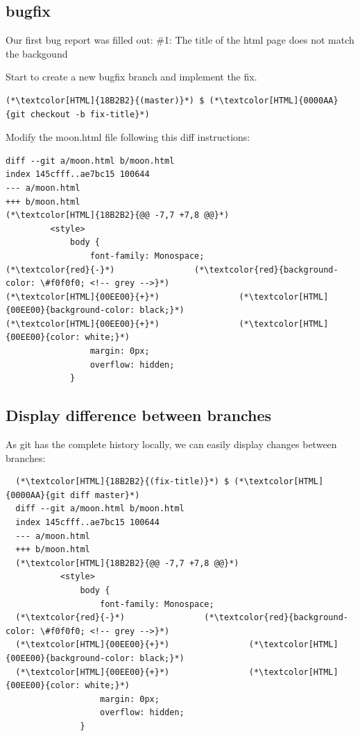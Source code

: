 \subsection{bugfix}
\begin{frame}[fragile]
    \subslidetitle

Our first bug report was filled out:
\newline \vspace{1em}
\#1: The title of the html page does not match the backgound

Start to create a new bugfix branch and implement the fix.
\begin{lstlisting}
(*\textcolor[HTML]{18B2B2}{(master)}*) $ (*\textcolor[HTML]{0000AA}{git checkout -b fix-title}*)
\end{lstlisting}

Modify the moon.html file following this diff instructions:
\begin{lstlisting}
diff --git a/moon.html b/moon.html
index 145cfff..ae7bc15 100644
--- a/moon.html
+++ b/moon.html
(*\textcolor[HTML]{18B2B2}{@@ -7,7 +7,8 @@}*)
         <style>
             body {
                 font-family: Monospace;
(*\textcolor{red}{-}*)                (*\textcolor{red}{background-color: \#f0f0f0; <!-- grey -->}*)
(*\textcolor[HTML]{00EE00}{+}*)                (*\textcolor[HTML]{00EE00}{background-color: black;}*)
(*\textcolor[HTML]{00EE00}{+}*)                (*\textcolor[HTML]{00EE00}{color: white;}*)
                 margin: 0px;
                 overflow: hidden;
             }
\end{lstlisting}
\end{frame}

\subsection{Display difference between branches}
\begin{frame}[fragile]
  \subslidetitle

  As git has the complete history locally, we can easily display changes between branches:

  \begin{lstlisting}
  (*\textcolor[HTML]{18B2B2}{(fix-title)}*) $ (*\textcolor[HTML]{0000AA}{git diff master}*)
  diff --git a/moon.html b/moon.html
  index 145cfff..ae7bc15 100644
  --- a/moon.html
  +++ b/moon.html
  (*\textcolor[HTML]{18B2B2}{@@ -7,7 +7,8 @@}*)
           <style>
               body {
                   font-family: Monospace;
  (*\textcolor{red}{-}*)                (*\textcolor{red}{background-color: \#f0f0f0; <!-- grey -->}*)
  (*\textcolor[HTML]{00EE00}{+}*)                (*\textcolor[HTML]{00EE00}{background-color: black;}*)
  (*\textcolor[HTML]{00EE00}{+}*)                (*\textcolor[HTML]{00EE00}{color: white;}*)
                   margin: 0px;
                   overflow: hidden;
               }
\end{lstlisting}
\end{frame}

